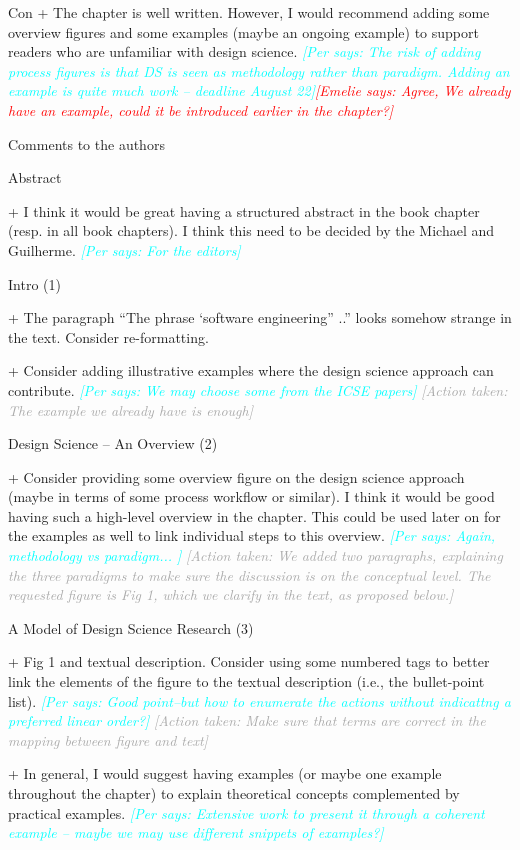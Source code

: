 \documentclass{article}
\newcommand{\emelie}[1]{\textcolor{red}{{\it [Emelie says: #1]}}}
\newcommand{\per}[1]{\textcolor{cyan}{{\it [Per says: #1]}}}
\newcommand{\action}[1]{\textcolor{darkgray}{{\it [Action taken: #1]}}}
\newcommand{\emelie}[1]{}
\newcommand{\per}[1]{}
\newcommand{\action}[1]{}
\begin{document}
Con
+ The chapter is well written. However, I would recommend adding some overview figures and some examples (maybe an ongoing example) to support readers who are unfamiliar with design science. \per{The risk of adding process figures is that DS is seen as methodology rather than paradigm. Adding an example is quite much work -- deadline August 22}\emelie{Agree, We already have an example, could it be introduced earlier in the chapter?}

Comments to the authors

Abstract

+ I think it would be great having a structured abstract in the book chapter (resp. in all book chapters). I think this need to be decided by the Michael and Guilherme. \per{For the editors}

Intro (1)

+ The paragraph “The phrase ‘software engineering” ..” looks somehow strange in the text. Consider re-formatting.

+ Consider adding illustrative examples where the design science approach can contribute. \per{We may choose some from the ICSE papers} \action{The example we already have is enough}

Design Science – An Overview (2)

+ Consider providing some overview figure on the design science approach (maybe in terms of some process workflow or similar). I think it would be good having such a high-level overview in the chapter. This could be used later on for the examples as well to link individual steps to this overview. \per{Again, methodology vs paradigm... }
\action{We added two paragraphs, explaining the three paradigms to make sure the discussion is on the conceptual level. The requested figure is Fig 1, which we clarify in the text, as proposed below.}

A Model of Design Science Research (3)

+ Fig 1 and textual description. Consider using some numbered tags to better link the elements of the figure to the textual description (i.e., the bullet-point list). \per{Good point--but how to enumerate the actions without indicattng a preferred linear order?} \action{Make sure that terms are correct in the mapping between figure and text}

+ In general, I would suggest having examples (or maybe one example throughout the chapter) to explain theoretical concepts complemented by practical examples. \per{Extensive work to present it through a coherent example -- maybe we may use different snippets of examples?}
\end{document}
